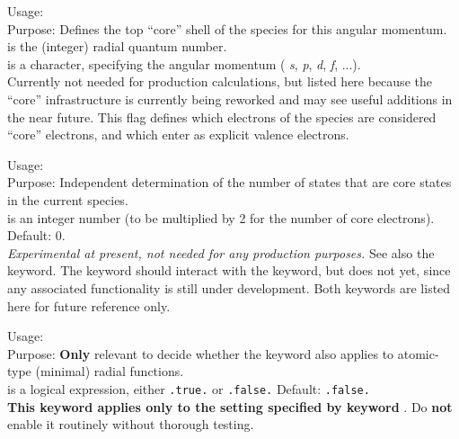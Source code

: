 {
  \noindent
  Usage:    \\[1.0ex]
  Purpose: Defines the top ``core'' shell of the species for this
    angular momentum. \\[1.0ex]  
   is the (integer) radial quantum number. \\
   is a character, specifying the angular momentum (
    \emph{s}, \emph{p}, \emph{d}, \emph{f}, ...). \\
}
Currently not needed for production calculations, but listed here
because the ``core'' infrastructure is currently being reworked and
may see useful additions in the near future. This flag defines 
which electrons of the species are considered ``core'' electrons, and
which enter as explicit valence electrons.

{
  \noindent
  Usage:   \\[1.0ex]
  Purpose: Independent determination of the number of states that are
    core states in the current species. \\[1.0ex]
   is an integer number (to be multiplied by 2 for the
    number of core electrons). Default: 0. \\
}
\emph{Experimental at present, not needed for any production
  purposes.} See also the  keyword. The
 keyword should interact with the
 keyword, but does not yet, since any
associated functionality is still under development. Both keywords are
listed here for future reference only.


{
  \noindent
  Usage:   \\[1.0ex]
  Purpose: \textbf{Only} relevant to decide whether the
     keyword also applies to
    atomic-type (minimal) radial functions. \\[1.0ex]
   is a logical expression, either \texttt{.true.} or
    \texttt{.false.} Default: \texttt{.false.} \\
}
\textbf{This keyword applies only to the setting specified by keyword}
. Do \textbf{not} enable it
routinely without thorough testing.

